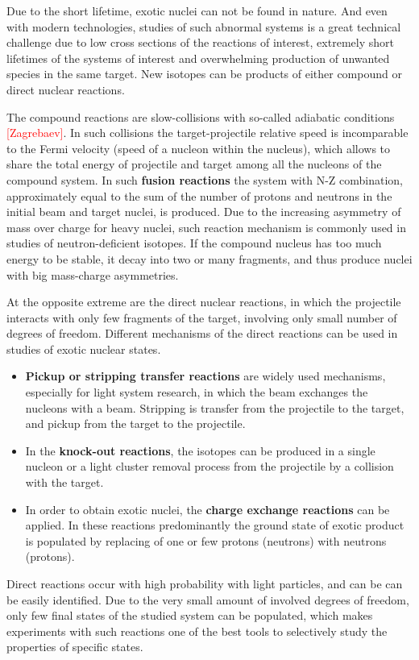 Due to the short lifetime, exotic nuclei can not be found in nature.
And even with modern technologies, studies of such abnormal systems is a great technical challenge due to low cross sections of the reactions of interest, extremely short lifetimes of the systems of interest and overwhelming production of unwanted species in the same target.
New isotopes can be products of either compound or direct nuclear reactions.

The compound reactions are slow-collisions with so-called adiabatic conditions \textcolor{red}{[Zagrebaev]}.
In such collisions the target-projectile relative speed is incomparable to the Fermi velocity (speed of a nucleon within the nucleus), which allows to share the total energy of projectile and target among all the nucleons of the compound system.
In such \textbf{fusion reactions} the system with N-Z combination, approximately equal to the sum of the number of protons and neutrons in the initial beam and target nuclei, is produced.
Due to the increasing asymmetry of mass over charge for heavy nuclei, such reaction mechanism is commonly used in studies of neutron-deficient isotopes.
If the compound nucleus has too much energy to be stable, it decay into two or many fragments, and thus produce nuclei with big mass-charge asymmetries.

At the opposite extreme are the direct nuclear reactions, in which the projectile interacts with only few fragments of the target, involving only small number of degrees of freedom.
Different mechanisms of the direct reactions can be used in studies of exotic nuclear states. 

\begin{itemize}
	
	\item 
	\textbf{Pickup or stripping transfer reactions} are widely used mechanisms, especially for light system research, in which the beam exchanges the nucleons with a beam. 
	Stripping is transfer from the projectile to the target, and pickup from the target to the projectile.
	
	\item
	In the \textbf{knock-out reactions}, the isotopes can be produced in a single nucleon or a light cluster removal process from the projectile by a collision with the target.
	
	\item
	In order to obtain exotic nuclei, the \textbf{charge exchange reactions} can be applied.
	In these reactions predominantly  the ground state of exotic product is populated by replacing of one or few protons (neutrons) with neutrons (protons).
	
	
\end{itemize}	
Direct reactions occur with high probability with light particles, and can be can be easily identified.
Due to the very small amount of involved degrees of freedom, only few final states of the studied system can be populated, which makes experiments with such reactions one of the best tools to selectively study the properties of specific states.


